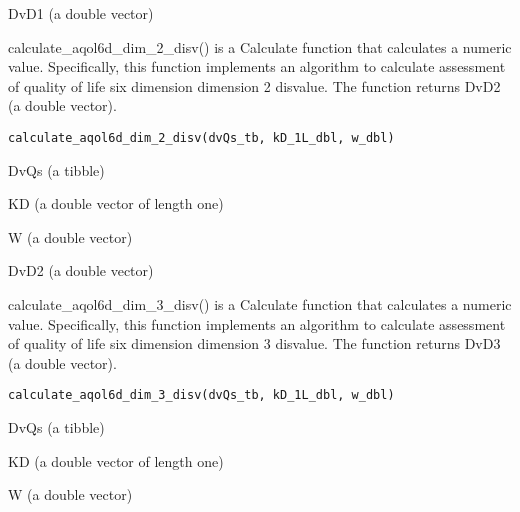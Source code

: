 \documentclass[a4paper]{book}
\begin{document}
%
\begin{Value}
DvD1 (a double vector)
\end{Value}
%
\begin{Description}\relax
calculate\_aqol6d\_dim\_2\_disv() is a Calculate function that calculates a numeric value. Specifically, this function implements an algorithm to calculate assessment of quality of life six dimension dimension 2 disvalue. The function returns DvD2 (a double vector).
\end{Description}
%
\begin{Usage}
\begin{verbatim}
calculate_aqol6d_dim_2_disv(dvQs_tb, kD_1L_dbl, w_dbl)
\end{verbatim}
\end{Usage}
%
\begin{Arguments}
\begin{ldescription}
\item[\code{dvQs\_tb}] DvQs (a tibble)

\item[\code{kD\_1L\_dbl}] KD (a double vector of length one)

\item[\code{w\_dbl}] W (a double vector)
\end{ldescription}
\end{Arguments}
%
\begin{Value}
DvD2 (a double vector)
\end{Value}
%
\begin{Description}\relax
calculate\_aqol6d\_dim\_3\_disv() is a Calculate function that calculates a numeric value. Specifically, this function implements an algorithm to calculate assessment of quality of life six dimension dimension 3 disvalue. The function returns DvD3 (a double vector).
\end{Description}
%
\begin{Usage}
\begin{verbatim}
calculate_aqol6d_dim_3_disv(dvQs_tb, kD_1L_dbl, w_dbl)
\end{verbatim}
\end{Usage}
%
\begin{Arguments}
\begin{ldescription}
\item[\code{dvQs\_tb}] DvQs (a tibble)

\item[\code{kD\_1L\_dbl}] KD (a double vector of length one)

\item[\code{w\_dbl}] W (a double vector)
\end{ldescription}
\end{Arguments}
\end{document}

